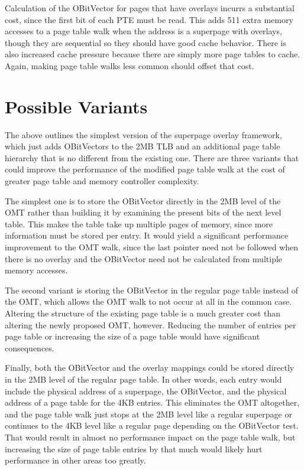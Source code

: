 Calculation of the OBitVector for pages that have overlays incurrs a substantial cost, since the first bit of each PTE must be read. This adds 511 extra memory accesses to a page table walk when the address is a superpage with overlays, though they are sequential so they should have good cache behavior. There is also increased cache pressure because there are simply more page tables to cache. Again, making page table walks less common should offset that cost.

\section{Possible Variants}
The above outlines the simplest version of the superpage overlay framework, which just adds OBitVectors to the 2MB TLB and an additional page table hierarchy that is no different from the existing one. There are three variants that could improve the performance of the modified page table walk at the cost of greater page table and memory controller complexity.

The simplest one is to store the OBitVector directly in the 2MB level of the OMT rather than building it by examining the present bits of the next level table. This makes the table take up multiple pages of memory, since more information must be stored per entry. It would yield a significant performance improvement to the OMT walk, since the last pointer need not be followed when there is no overlay and the OBitVector need not be calculated from multiple memory accesses.

The second variant is storing the OBitVector in the regular page table instead of the OMT, which allows the OMT walk to not occur at all in the common case. Altering the structure of the existing page table is a much greater cost than altering the newly proposed OMT, however. Reducing the number of entries per page table or increasing the size of a page table would have significant consequences.

Finally, both the OBitVector and the overlay mappings could be stored directly in the 2MB level of the regular page table. In other words, each entry would include the physical address of a superpage, the OBitVector, and the physical address of a page table for the 4KB entries. This eliminates the OMT altogether, and the page table walk just stops at the 2MB level like a regular superpage or continues to the 4KB level like a regular page depending on the OBitVector test. That would result in almost no performance impact on the page table walk, but increasing the size of page table entries by that much would likely hurt performance in other areas too greatly.

